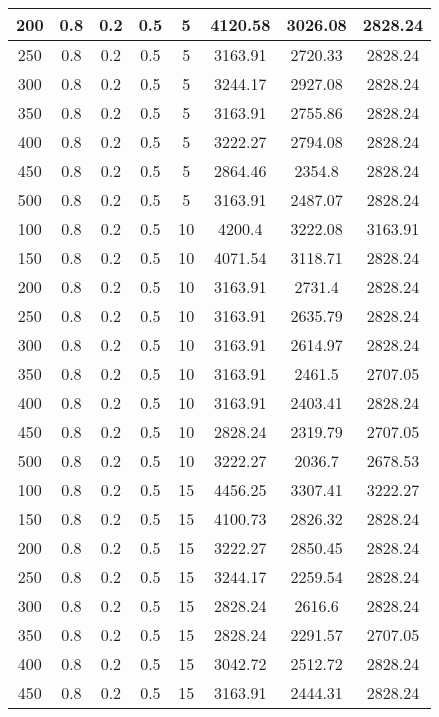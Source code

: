 \documentclass[a4paper, 12pt]{extreport}
\begin{document}
\begin{itemize}
\begin{longtable}{|c|c|c|c|c|c|c|c|}
			200 & 0.8 & 0.2 & 0.5 & 5 & 4120.58 & 3026.08 & 2828.24 \\\hline
			250 & 0.8 & 0.2 & 0.5 & 5 & 3163.91 & 2720.33 & 2828.24 \\\hline
			300 & 0.8 & 0.2 & 0.5 & 5 & 3244.17 & 2927.08 & 2828.24 \\\hline
			350 & 0.8 & 0.2 & 0.5 & 5 & 3163.91 & 2755.86 & 2828.24 \\\hline
			400 & 0.8 & 0.2 & 0.5 & 5 & 3222.27 & 2794.08 & 2828.24 \\\hline
			450 & 0.8 & 0.2 & 0.5 & 5 & 2864.46 & 2354.8 & 2828.24 \\\hline
			500 & 0.8 & 0.2 & 0.5 & 5 & 3163.91 & 2487.07 & 2828.24 \\\hline
			100 & 0.8 & 0.2 & 0.5 & 10 & 4200.4 & 3222.08 & 3163.91 \\\hline
			150 & 0.8 & 0.2 & 0.5 & 10 & 4071.54 & 3118.71 & 2828.24 \\\hline
			200 & 0.8 & 0.2 & 0.5 & 10 & 3163.91 & 2731.4 & 2828.24 \\\hline
			250 & 0.8 & 0.2 & 0.5 & 10 & 3163.91 & 2635.79 & 2828.24 \\\hline
			300 & 0.8 & 0.2 & 0.5 & 10 & 3163.91 & 2614.97 & 2828.24 \\\hline
			350 & 0.8 & 0.2 & 0.5 & 10 & 3163.91 & 2461.5 & 2707.05 \\\hline
			400 & 0.8 & 0.2 & 0.5 & 10 & 3163.91 & 2403.41 & 2828.24 \\\hline
			450 & 0.8 & 0.2 & 0.5 & 10 & 2828.24 & 2319.79 & 2707.05 \\\hline
			500 & 0.8 & 0.2 & 0.5 & 10 & 3222.27 & 2036.7 & 2678.53 \\\hline
			100 & 0.8 & 0.2 & 0.5 & 15 & 4456.25 & 3307.41 & 3222.27 \\\hline
			150 & 0.8 & 0.2 & 0.5 & 15 & 4100.73 & 2826.32 & 2828.24 \\\hline
			200 & 0.8 & 0.2 & 0.5 & 15 & 3222.27 & 2850.45 & 2828.24 \\\hline
			250 & 0.8 & 0.2 & 0.5 & 15 & 3244.17 & 2259.54 & 2828.24 \\\hline
			300 & 0.8 & 0.2 & 0.5 & 15 & 2828.24 & 2616.6 & 2828.24 \\\hline
			350 & 0.8 & 0.2 & 0.5 & 15 & 2828.24 & 2291.57 & 2707.05 \\\hline
			400 & 0.8 & 0.2 & 0.5 & 15 & 3042.72 & 2512.72 & 2828.24 \\\hline
			450 & 0.8 & 0.2 & 0.5 & 15 & 3163.91 & 2444.31 & 2828.24 \\\hline

\end{longtable}
\end{itemize}
\end{document}
